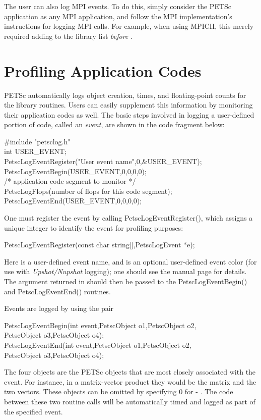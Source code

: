 {{The user can also log MPI events.  To do this, simply consider the
PETSc application as any MPI application, and follow the MPI
implementation's instructions for logging MPI calls. For example, when
using MPICH, this merely required adding  to the library
list {\em before} .

\section{Profiling Application Codes}
\label{sec_profileuser}

PETSc automatically logs object creation, times, and floating-point
counts for the library routines. Users can easily supplement
this information by monitoring their application codes as well.  
The basic steps involved in logging a
user-defined portion of code, called an {\em event}, are shown in the 
code fragment below:
\begin{tabbing}
    \#include "petsclog.h"\\
    int USER\_EVENT;\\
    PetscLogEventRegister("User event name",0,\&USER\_EVENT);\\
    PetscLogEventBegin(USER\_EVENT,0,0,0,0);\\
       /* application code segment to monitor */\\
       PetscLogFlops(number of flops for this code segment);\\
    PetscLogEventEnd(USER\_EVENT,0,0,0,0);
\end{tabbing}

One must register the event by calling PetscLogEventRegister(), which assigns a unique integer to identify the
event for profiling purposes: 
\begin{tabbing}
  PetscLogEventRegister(const char string[],PetscLogEvent *e);
\end{tabbing}
Here  is a user-defined event name, and  is an
optional user-defined event color (for use with {\em Upshot/Nupshot} logging);
one should see the manual page for details.  The argument returned in  should then
be passed to the PetscLogEventBegin() and PetscLogEventEnd()
routines.

Events are logged by using the pair 
\begin{tabbing}
   PetscLogEventBegin(int event,PetscObject o1,PetscObject o2,\\
                      PetscObject o3,PetscObject o4);\\
   PetscLogEventEnd(int event,PetscObject o1,PetscObject o2,\\
                    PetscObject o3,PetscObject o4);
\end{tabbing}
The
four objects are the PETSc objects that are most closely associated 
with the event.  For instance, in a matrix-vector product they 
would be the matrix and the two vectors.  These objects can be omitted
by specifying 0 for  - .  The code between these 
two routine calls will be automatically timed and logged as part of the
specified event.

}}
